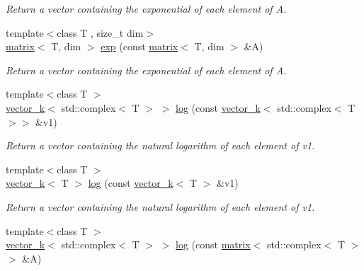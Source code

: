 \begin{DoxyCompactItemize}
\begin{DoxyCompactList}\small\item\em Return a vector containing the exponential of each element of A. \end{DoxyCompactList}\item 
\hypertarget{namespacekeycpp_a89087f62a5d5d136ad88493b920953ac}{{\footnotesize template$<$class T , size\-\_\-t dim$>$ }\\\hyperlink{classkeycpp_1_1matrix}{matrix}$<$ T, dim $>$ \hyperlink{namespacekeycpp_a89087f62a5d5d136ad88493b920953ac}{exp} (const \hyperlink{classkeycpp_1_1matrix}{matrix}$<$ T, dim $>$ \&A)}\label{namespacekeycpp_a89087f62a5d5d136ad88493b920953ac}

\begin{DoxyCompactList}\small\item\em Return a vector containing the exponential of each element of A. \end{DoxyCompactList}\item 
\hypertarget{namespacekeycpp_a3f3de1f36299e80f237c0e9669b9ee1d}{{\footnotesize template$<$class T $>$ }\\\hyperlink{classkeycpp_1_1vector__k}{vector\-\_\-k}$<$ std\-::complex$<$ T $>$ $>$ \hyperlink{namespacekeycpp_a3f3de1f36299e80f237c0e9669b9ee1d}{log} (const \hyperlink{classkeycpp_1_1vector__k}{vector\-\_\-k}$<$ std\-::complex$<$ T $>$$>$ \&v1)}\label{namespacekeycpp_a3f3de1f36299e80f237c0e9669b9ee1d}

\begin{DoxyCompactList}\small\item\em Return a vector containing the natural logarithm of each element of v1. \end{DoxyCompactList}\item 
\hypertarget{namespacekeycpp_a1b4681da0aec9ca45280970b47fd55d6}{{\footnotesize template$<$class T $>$ }\\\hyperlink{classkeycpp_1_1vector__k}{vector\-\_\-k}$<$ T $>$ \hyperlink{namespacekeycpp_a1b4681da0aec9ca45280970b47fd55d6}{log} (const \hyperlink{classkeycpp_1_1vector__k}{vector\-\_\-k}$<$ T $>$ \&v1)}\label{namespacekeycpp_a1b4681da0aec9ca45280970b47fd55d6}

\begin{DoxyCompactList}\small\item\em Return a vector containing the natural logarithm of each element of v1. \end{DoxyCompactList}\item 
\hypertarget{namespacekeycpp_a68ebe3cd64dbf2c0d09f33f5e7951317}{{\footnotesize template$<$class T $>$ }\\\hyperlink{classkeycpp_1_1vector__k}{vector\-\_\-k}$<$ std\-::complex$<$ T $>$ $>$ \hyperlink{namespacekeycpp_a68ebe3cd64dbf2c0d09f33f5e7951317}{log} (const \hyperlink{classkeycpp_1_1matrix}{matrix}$<$ std\-::complex$<$ T $>$$>$ \&A)}\label{namespacekeycpp_a68ebe3cd64dbf2c0d09f33f5e7951317}


\end{DoxyCompactItemize}
